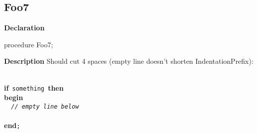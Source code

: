 \documentclass{report}
\newif\ifpdf
\begin{document}
\subsection*{Foo7}
\fi
\label{ok_longcode_indentation-Foo7}
\begin{list}{}{
\setlength{\itemindent}{0cm}
\setlength{\listparindent}{0cm}
\setlength{\leftmargin}{\evensidemargin}
\addtolength{\leftmargin}{\tmplength}
\settowidth{\labelsep}{X}
\addtolength{\leftmargin}{\labelsep}
\setlength{\labelwidth}{\tmplength}
}
\item[\textbf{Declaration}\hfill]
\ifpdf
\begin{flushleft}
\fi
\begin{ttfamily}
procedure Foo7;\end{ttfamily}

\ifpdf
\end{flushleft}
\fi

\par
\item[\textbf{Description}]
Should cut 4 spaces (empty line doesn't shorten IndentationPrefix):

\texttt{\\\nopagebreak[3]
}\textbf{if}\texttt{~something~}\textbf{then}\texttt{\\\nopagebreak[3]
}\textbf{begin}\texttt{\\\nopagebreak[3]
~~\textit{//~empty~line~below}\\\nopagebreak[3]
\\\nopagebreak[3]
}\textbf{end}\texttt{;\\
}

\end{list}
\end{document}
